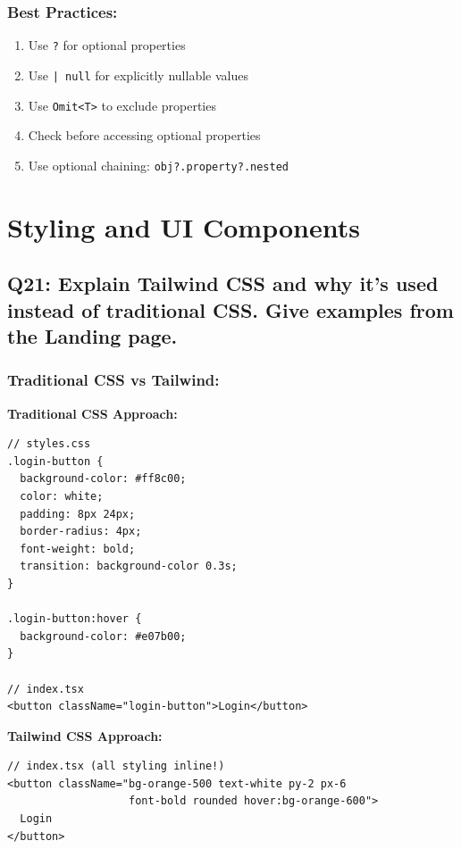 \documentclass[12pt]{article}
\begin{document}
\subsubsection*{Best Practices:}

\begin{enumerate}
    \item Use \texttt{?} for optional properties
    \item Use \texttt{| null} for explicitly nullable values
    \item Use \texttt{Omit<T>} to exclude properties
    \item Check before accessing optional properties
    \item Use optional chaining: \texttt{obj?.property?.nested}
\end{enumerate}

\section{Styling and UI Components}

\subsection{Q21: Explain Tailwind CSS and why it's used instead of traditional CSS. Give examples from the Landing page.}

\subsubsection*{Traditional CSS vs Tailwind:}

\textbf{Traditional CSS Approach:}

\begin{lstlisting}
// styles.css
.login-button {
  background-color: #ff8c00;
  color: white;
  padding: 8px 24px;
  border-radius: 4px;
  font-weight: bold;
  transition: background-color 0.3s;
}

.login-button:hover {
  background-color: #e07b00;
}

// index.tsx
<button className="login-button">Login</button>
\end{lstlisting}

\textbf{Tailwind CSS Approach:}

\begin{lstlisting}
// index.tsx (all styling inline!)
<button className="bg-orange-500 text-white py-2 px-6 
                   font-bold rounded hover:bg-orange-600">
  Login
</button>
\end{lstlisting}
\end{document}
